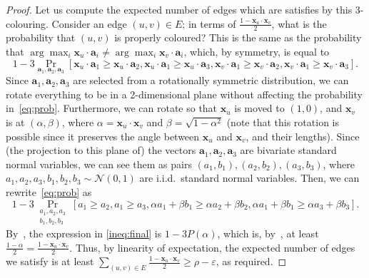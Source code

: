 \documentclass[a4paper,11pt, DIV=11]{scrartcl}
\newcommand{\vx}{\ensuremath{\mathbf{x}}}
\newcommand{\va}{\ensuremath{\mathbf{a}}}
\theoremstyle{plain}
\theoremstyle{definition}
\begin{document}
\begin{proof}
Let us compute the expected number of edges which are satisfies by this 3-colouring. Consider an edge $(u, v) \in E$; in terms of $\frac{1 - \vx_u \cdot \vx_v}{2}$, what is the probability that $(u, v)$ is properly coloured? This is the same as the probability that $\arg \max_i \vx_u \cdot \va_i \neq \arg \max_i \vx_v \cdot \va_i$, which, by symmetry, is equal to
\begin{equation}\label{eq:prob}
1 - 3 \Pr_{\va_1, \va_2, \va_3}[
\vx_u \cdot \va_1 \geq \vx_u \cdot \va_2,
\vx_u \cdot \va_1 \geq \vx_u \cdot \va_3,
\vx_v \cdot \va_1 \geq \vx_v \cdot \va_2,
\vx_v \cdot \va_1 \geq \vx_v \cdot \va_3].
\end{equation}
Since $\va_1, \va_2, \va_3$ are selected from a rotationally symmetric distribution, we can rotate everything to be in a 2-dimensional plane without affecting the probability in~\eqref{eq:prob}. Furthermore, we can rotate so that $\vx_u$ is moved to $(1, 0)$, and $\vx_v$ is at $(\alpha, \beta)$, where $\alpha = \vx_u \cdot \vx_v$ and $\beta = \sqrt{1 - \alpha^2}$ (note that this rotation is possible since it preserves the angle between $\vx_u$ and $\vx_v$, and their lengths). Since (the projection to this plane of) the vectors $\va_1, \va_2, \va_3$ are bivariate standard normal variables, we can see them as pairs $(a_1, b_1), (a_2, b_2), (a_3, b_3)$, where $a_1, a_2, a_3, b_1, b_2, b_3 \sim \mathcal{N}(0, 1)$ are i.i.d.~standard normal variables. Then, we can rewrite~\eqref{eq:prob} as
\begin{equation}\label{ineq:final}
1 - 3 \Pr_{\substack{a_1, a_2, a_3 \\ b_1, b_2, b_3}}[a_1 \geq a_2, a_1 \geq a_3, \alpha a_1 + \beta b_1 \geq \alpha a_2 + \beta b_2, \alpha a_1 + \beta b_1 \geq \alpha a_3 + \beta b_3 ].
\end{equation}
By~, the expression in \eqref{ineq:final} is $1 - 3P(\alpha)$, which is, by~, at least $\frac{1 - \alpha}{2} = \frac{1 - \vx_u \cdot \vx_v}{2}$. Thus, by linearity of expectation, the expected number of edges we satisfy is at least
$\sum_{(u, v) \in E}\frac{1 - \vx_u \cdot \vx_v}{2} \geq \rho - \varepsilon$, as required.
\end{proof}
\end{document}
